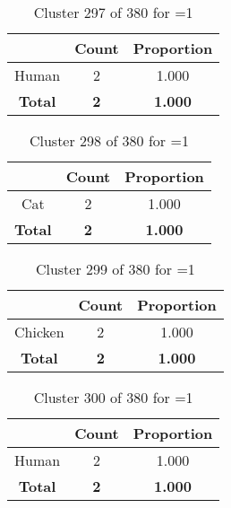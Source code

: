\begin{table}[ht!]
\centering
\begin{tabular}{|c|c|c|}
\hline
\bf \Spec{} &\bf Count &\bf Proportion\\ \hline \hline
Human & 2 & 1.000\\ \hline
\hline
\bf Total & \bf 2 & \bf 1.000\\ \hline
\end{tabular}
\label{tab:cluster:297:1}
\caption{Cluster 297 of 380 for \minneigh{}=1}
\end{table}

\begin{table}[ht!]
\centering
\begin{tabular}{|c|c|c|}
\hline
\bf \Spec{} &\bf Count &\bf Proportion\\ \hline \hline
Cat & 2 & 1.000\\ \hline
\hline
\bf Total & \bf 2 & \bf 1.000\\ \hline
\end{tabular}
\label{tab:cluster:298:1}
\caption{Cluster 298 of 380 for \minneigh{}=1}
\end{table}

\begin{table}[ht!]
\centering
\begin{tabular}{|c|c|c|}
\hline
\bf \Spec{} &\bf Count &\bf Proportion\\ \hline \hline
Chicken & 2 & 1.000\\ \hline
\hline
\bf Total & \bf 2 & \bf 1.000\\ \hline
\end{tabular}
\label{tab:cluster:299:1}
\caption{Cluster 299 of 380 for \minneigh{}=1}
\end{table}

\clearpage
\begin{table}[ht!]
\centering
\begin{tabular}{|c|c|c|}
\hline
\bf \Spec{} &\bf Count &\bf Proportion\\ \hline \hline
Human & 2 & 1.000\\ \hline
\hline
\bf Total & \bf 2 & \bf 1.000\\ \hline
\end{tabular}
\label{tab:cluster:300:1}
\caption{Cluster 300 of 380 for \minneigh{}=1}
\end{table}

